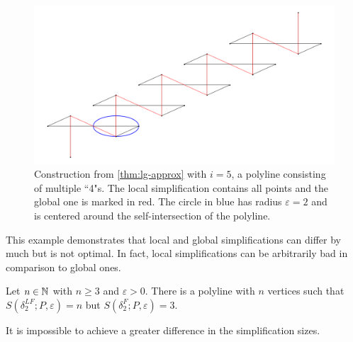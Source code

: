 \begin{figure}[h!tbp]
  \centering
	\includegraphics[scale=0.3]{./figures/local-global-bigdiff.png}
	\caption{Construction from \cref{thm:lg-approx} with \(i = 5\), a polyline consisting of multiple ``4"s. The local simplification contains all points and the global one is marked in red. The circle in blue has radius \(\varepsilon = 2\) and is centered around the self-intersection of the polyline.}
  \label{fig:local-global-bigdiff}
\end{figure}

This example demonstrates that local and global simplifications can differ by much but is not optimal. In fact, local simplifications can be arbitrarily bad in comparison to global ones.
\begin{theorem}
	Let \(n \in \mathbb{N}\) with \(n \geq 3\) and \(\varepsilon > 0\). There is a polyline with \(n\) vertices such that \(S(\delta^{LF}_2; P, \varepsilon) = n\) but \(S(\delta^F_2; P, \varepsilon) = 3\).

	It is impossible to achieve a greater difference in the simplification sizes.
\end{theorem}


